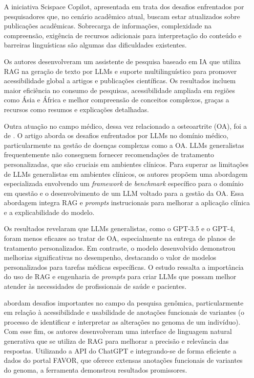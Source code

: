 A iniciativa Scispace Copilot, apresentada em  trata dos desafios enfrentados por pesquisadores que, no cenário acadêmico atual, buscam estar atualizados sobre publicações acadêmicas. Sobrecarga de informações, complexidade na compreensão, exigência de recursos adicionais para interpretação do conteúdo e barreiras linguísticas são algumas das dificuldades existentes. 

Os autores desenvolveram um assistente de pesquisa baseado em \ac{IA} que utiliza \ac{RAG} na geração de texto por \ac{LLM}s e suporte multilinguístico para promover acessibilidade global a artigos e publicações científicas. Os resultados incluem maior eficiência no consumo de pesquisas, acessibilidade ampliada em regiões como Ásia e África e melhor compreensão de conceitos complexos, graças a recursos como resumos e explicações detalhadas.

Outra atuação no campo médico, dessa vez relacionado a osteoartrite (OA), foi a de . O artigo aborda os desafios enfrentados por \ac{LLM}s no domínio médico, particularmente na gestão de doenças complexas como a OA. \ac{LLM}s generalistas frequentemente não conseguem fornecer recomendações de tratamento personalizadas, que são cruciais em ambientes clínicos. Para superar as limitações de \ac{LLM}s generalistas em ambientes clínicos, os autores propõem uma abordagem especializada envolvendo um \textit{framework} de \textit{benchmark} específico para o domínio em questão e o desenvolvimento de um \ac{LLM} voltado para a gestão da OA. Essa abordagem integra \ac{RAG} e \textit{prompts} instrucionais para melhorar a aplicação clínica e a explicabilidade do modelo.

Os resultados revelaram que \ac{LLM}s generalistas, como o GPT-3.5 e o GPT-4, foram menos eficazes ao tratar de OA, especialmente na entrega de planos de tratamento personalizados. Em contraste, o modelo desenvolvido demonstrou melhorias significativas no desempenho, destacando o valor de modelos personalizados para tarefas médicas específicas. O estudo ressalta a importância do uso de \ac{RAG} e engenharia de \textit{prompts} para criar \ac{LLM}s que possam melhor atender às necessidades de profissionais de saúde e pacientes.

 abordam desafios importantes no campo da pesquisa genômica, particularmente em relação à acessibilidade e usabilidade de anotações funcionais de variantes (o processo de identificar e interpretar as alterações no genoma de um indivíduo). Com esse fim, os autores desenvolveram uma interface de linguagem natural generativa que se utiliza de \ac{RAG} para melhorar a precisão e relevância das respostas. Utilizando a API do ChatGPT e integrando-se de forma eficiente a dados do portal FAVOR, que oferece extensas anotações funcionais de variantes do genoma, a ferramenta demonstrou resultados promissores.

